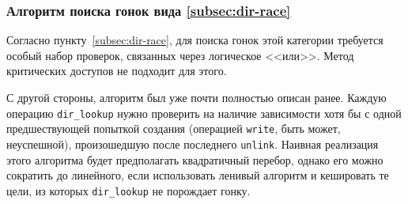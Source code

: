 \subsubsection{Алгоритм поиска гонок вида \ref{subsec:dir-race}}

Согласно пункту~\ref{subsec:dir-race}, для поиска гонок этой категории требуется особый набор проверок, связанных через логическое <<или>>. Метод критических доступов не подходит для этого.

С другой стороны, алгоритм был уже почти полностью описан ранее. Каждую операцию \texttt{dir\_lookup} нужно проверить на наличие зависимости хотя бы с одной предшествующей попыткой создания (операцией \texttt{write}, быть может, неуспешной), произошедшую после последнего \texttt{unlink}. Наивная реализация этого алгоритма будет предполагать квадратичный перебор, однако его можно сократить до линейного, если использовать ленивый алгоритм и кешировать те цели, из которых \texttt{dir\_lookup} не порождает гонку.
